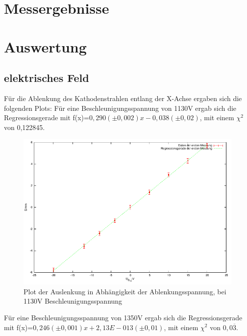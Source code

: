 \documentclass[12pt]{scrartcl}
\begin{document}
\section{Messergebnisse}



\section{Auswertung}
\subsection{elektrisches Feld}
Für die Ablenkung des Kathodenstrahlen entlang der X-Achse ergaben sich die folgenden Plots:
\newpage
Für eine Beschleunigungsspannung von 1130V ergab sich die Regressionsgerade mit f(x)=$0,290 (\pm 0,002 ) x  - 0,038 (\pm 0,02)$, mit einem $\chi^2$ von 0,122845.


\begin{figure}[htbp] 
  \centering
    \includegraphics[scale = 1]{x_1.pdf}
  	\caption[Plot der Auslenkung in Abhängigkeit der Ablenkungsspannung, bei 1130V Beschleunigungsspannung]{Plot der Auslenkung in Abhängigkeit der Ablenkungsspannung, bei 1130V Beschleunigungsspannung}
  \label{fig:x_1}
\end{figure}



\newpage

Für eine Beschleunigungsspannung von 1350V ergab sich die Regressionsgerade mit f(x)=$0,246 (\pm 0,001) x  + 2,13E-013	 (\pm 0,01)$, mit einem $\chi^2$ von $0,0\overline{3}$. %
\end{document}
